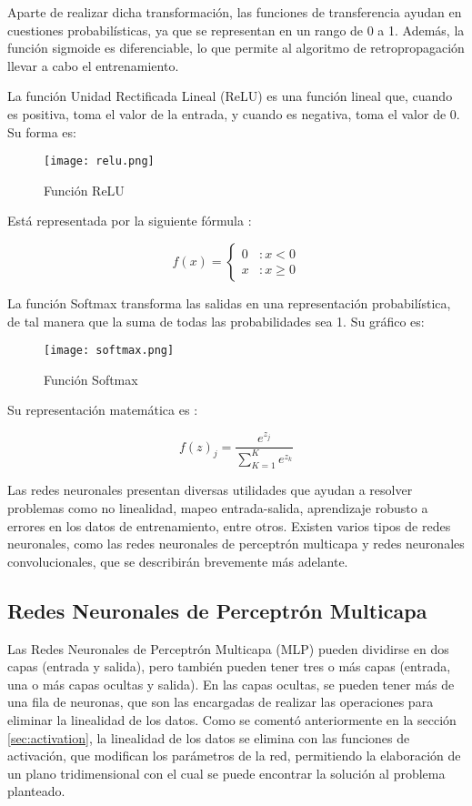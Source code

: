 Aparte de realizar dicha transformación, las funciones de transferencia ayudan en cuestiones probabilísticas, ya que se representan en un rango de 0 a 1. Además, la función sigmoide es diferenciable, lo que permite al algoritmo de retropropagación llevar a cabo el entrenamiento.

La función Unidad Rectificada Lineal (ReLU) es una función lineal que, cuando es positiva, toma el valor de la entrada, y cuando es negativa, toma el valor de 0. Su forma es:

\begin{figure}[H]
    \centering
    \texttt{[image: relu.png]}
    \caption{Función ReLU}
    \label{fig:fig6}
\end{figure}

Está representada por la siguiente fórmula \cite{Freire2021}:

\[
f(x) = \left\{ \begin{array}{lr} 
0 & : x < 0 \\
x & : x \ge 0 
\end{array} \right.
\]

La función Softmax transforma las salidas en una representación probabilística, de tal manera que la suma de todas las probabilidades sea 1. Su gráfico es:

\begin{figure}[H]
    \centering
    \texttt{[image: softmax.png]}
    \caption{Función Softmax}
    \label{fig:fig7}
\end{figure}

Su representación matemática es \cite{calvo-2018}:

\[
f(z)_j = \frac{e^{z_j}}{\sum_{K=1}^{K} e^{z_k}}
\]

Las redes neuronales presentan diversas utilidades que ayudan a resolver problemas como no linealidad, mapeo entrada-salida, aprendizaje robusto a errores en los datos de entrenamiento, entre otros. Existen varios tipos de redes neuronales, como las redes neuronales de perceptrón multicapa y redes neuronales convolucionales, que se describirán brevemente más adelante.

\subsection{Redes Neuronales de Perceptrón Multicapa}

Las Redes Neuronales de Perceptrón Multicapa (MLP) pueden dividirse en dos capas (entrada y salida), pero también pueden tener tres o más capas (entrada, una o más capas ocultas y salida). En las capas ocultas, se pueden tener más de una fila de neuronas, que son las encargadas de realizar las operaciones para eliminar la linealidad de los datos. Como se comentó anteriormente en la sección \ref{sec:activation}, la linealidad de los datos se elimina con las funciones de activación, que modifican los parámetros de la red, permitiendo la elaboración de un plano tridimensional con el cual se puede encontrar la solución al problema planteado.

